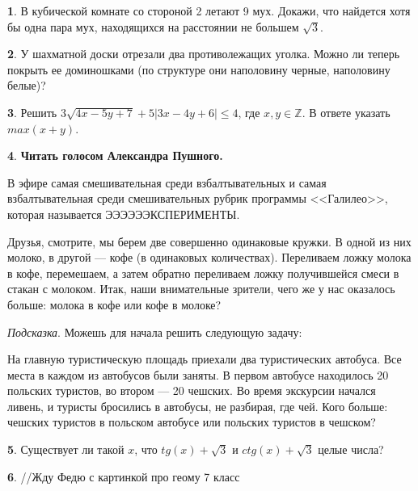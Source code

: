 \documentclass[14pt, a4paper]{extarticle}
\theoremstyle{definition}
\newtheorem{problem}{}
\theoremstyle{definition}
\theoremstyle{remark}
\numberwithin{equation}{section}
\newcommand{\Z}{\ensuremath{\mathbb{Z}}}
\begin{document}
\begin{problem}
    В кубической комнате со стороной 2 летают 9 мух. 
    Докажи, что найдется хотя бы одна пара мух, 
    находящихся на расстоянии не большем $\sqrt{3}$.
\end{problem}

\begin{problem}
    У шахматной доски отрезали два противолежащих уголка.
    Можно ли теперь покрыть ее доминошками (по структуре они
    наполовину черные, наполовину белые)?
\end{problem}

\begin{problem}
    Решить $3\sqrt{4x - 5y + 7} +
    5|3x - 4y + 6| \leqslant 4$, где $x, y \in \Z$.
    В ответе указать $max(x+y)$.
\end{problem}

\begin{problem}
    \textbf{Читать голосом Александра Пушного.}

    В эфире самая смешивательная среди взбалтывательных и самая
    взбалтывательная среди смешивательных рубрик программы <<Галилео>>, 
    которая называется ЭЭЭЭЭЭКСПЕРИМЕНТЫ.
    
    Друзья, смотрите, мы берем две совершенно одинаковые кружки.
    В одной из них молоко, в другой --- кофе (в одинаковых количествах). 
    Переливаем ложку молока в кофе, перемешаем, 
    а затем обратно переливаем ложку получившейся смеси в стакан с молоком. 
    Итак, наши внимательные зрители, чего же у нас оказалось больше:
    молока в кофе или кофе в молоке?

    \textit{Подсказка}. Можешь для начала решить следующую задачу:

    На главную туристическую площадь приехали два туристических 
    автобуса. Все места в каждом из автобусов были заняты. 
    В первом автобусе находилось 20 польских 
    туристов, во втором --- 20 чешских. Во время экскурсии 
    начался ливень, и туристы бросились в автобусы, не разбирая, где чей. 
    Кого больше: чешских туристов в польском автобусе или польских 
    туристов в чешском?
\end{problem}

\begin{problem}
    Существует ли такой $x$, что $tg(x) + \sqrt{3}$ и 
    $ctg(x) + \sqrt{3}$ целые числа?
\end{problem}

\begin{problem}
    //Жду Федю с картинкой про геому 7 класс
\end{problem}
\end{document}
